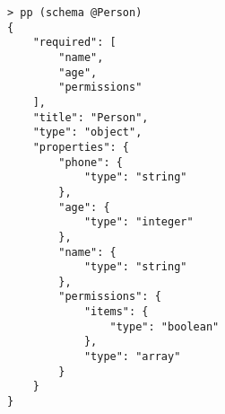 \begin{repl}\begin{lstlisting}
> pp (schema @Person)
{
    "required": [
        "name",
        "age",
        "permissions"
    ],
    "title": "Person",
    "type": "object",
    "properties": {
        "phone": {
            "type": "string"
        },
        "age": {
            "type": "integer"
        },
        "name": {
            "type": "string"
        },
        "permissions": {
            "items": {
                "type": "boolean"
            },
            "type": "array"
        }
    }
}\end{lstlisting}\end{repl}
